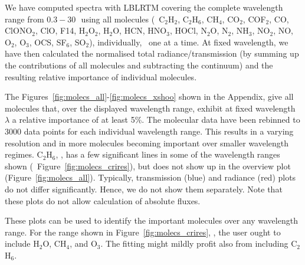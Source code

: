 We have computed spectra with \ac{LBLRTM} covering the complete wavelength
range from $0.3-30$\,\mum\ using all molecules (\ie\ C$_{2}$H$_{2}$,
C$_{2}$H$_{6}$, CH$_{4}$, CO$_{2}$, COF$_{2}$, CO, ClONO$_{2}$, ClO, F14,
H$_{2}$O$_{2}$, H$_{2}$O, HCN, HNO$_{3}$, HOCl, N$_{2}$O, N$_{2}$, NH$_{3}$,
NO$_{2}$, NO, O$_{2}$, O$_{3}$, OCS, SF$_{6}$, SO$_{2}$), individually, \ie\ one
at a time. At fixed wavelength, we have then calculated the normalised total
radiance/transmission (by summing up the contributions of all molecules and
subtracting the continuum) and the resulting relative importance of individual
molecules.

The Figures~\ref{fig:molecs_all}-\ref{fig:molecs_xshoo} shown in the Appendix,
give all molecules that, over the displayed wavelength range, exhibit at
fixed wavelength $\lambda$ a relative importance of at least 5\%. The molecular
data have been rebinned to 3000 data points for each individual wavelength
range. This results in a varying resolution and in more molecules becoming
important over smaller wavelength regimes. C$_{2}$H$_{6}$, \eg, has a few
significant lines in some of the wavelength ranges shown (\eg\
Figure~\ref{fig:molecs_crires}), but does not show up in the overview plot
(Figure~\ref{fig:molecs_all}). Typically, transmission (blue) and radiance
(red) plots do not differ significantly. Hence, we do not show them separately.
Note that these plots do not allow calculation of absolute fluxes.

These plots can be used to identify the important molecules over any wavelength
range. For the range shown in Figure~\ref{fig:molecs_crires}, \eg, the user
ought to include H$_{2}$O, CH$_{4}$, and O$_{3}$. The fitting might mildly profit
also from including C$_{2}$H$_{6}$.




